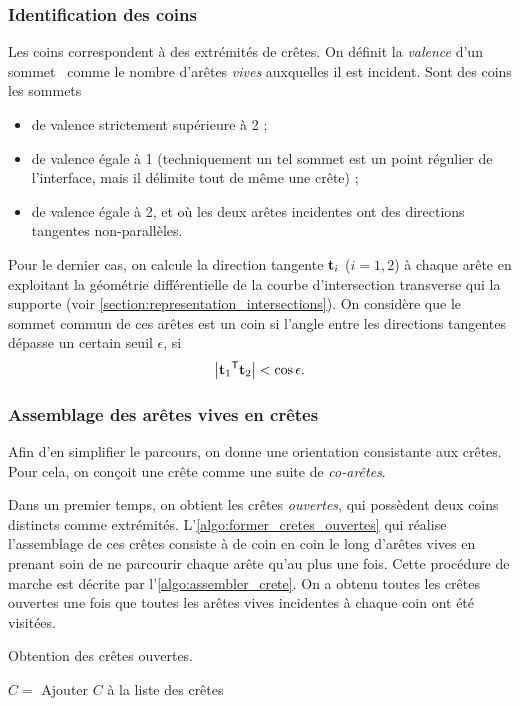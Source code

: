 \subsubsection{Identification des coins}
Les coins correspondent à des extrémités de crêtes. 
On définit la \textit{valence} d'un sommet \brep\ comme le nombre d'arêtes \textit{vives} auxquelles il est incident. 
Sont des coins les sommets
\begin{itemize}
	\item de valence strictement supérieure à 2 ;
	\item de valence égale à 1 (techniquement un tel sommet est un point régulier de l'interface, mais il délimite tout de même une crête) ;
	\item de valence égale à 2, et où les deux arêtes incidentes ont des directions tangentes non-parallèles.
\end{itemize}

Pour le dernier cas, on calcule la direction tangente $\mathbf{t}_i$ ($i = 1,2$) à chaque arête en exploitant la géométrie différentielle de la courbe d'intersection transverse qui la supporte (voir \autoref{section:representation_intersections}). 
On considère que le sommet commun de ces arêtes est un coin si l'angle entre les directions tangentes dépasse un certain seuil $\epsilon$, \ie si 
\begin{equation}
	\left| {\mathbf{t}_1} ^\mathsf{T} {\mathbf{t}_2} \right| < \cos \epsilon.
\end{equation}



\subsubsection{Assemblage des arêtes vives en crêtes}
Afin d'en simplifier le parcours, on donne une orientation consistante aux crêtes. 
Pour cela, on conçoit une crête comme une suite de \textit{co-arêtes}.
\par
Dans un premier temps, on obtient les crêtes \textit{ouvertes}, \ie qui possèdent deux coins distincts comme extrémités. 
L'\autoref{algo:former_cretes_ouvertes} qui réalise l'assemblage de ces crêtes consiste à  de coin en coin le long d'arêtes vives en prenant soin de ne parcourir chaque arête qu'au plus une fois. 
Cette procédure de marche est décrite par l'\autoref{algo:assembler_crete}. 
On a obtenu toutes les crêtes ouvertes une fois que toutes les arêtes vives incidentes à chaque coin ont été visitées. 


\begin{algorithm}
	\caption{Obtention des crêtes ouvertes.}\label{algo:former_cretes_ouvertes}
	\begin{algorithmic}[1]
					\State $C = $ 
					\State Ajouter $C$ à la liste des crêtes
				\EndFor
			\EndFor
	\end{algorithmic}
\end{algorithm}

